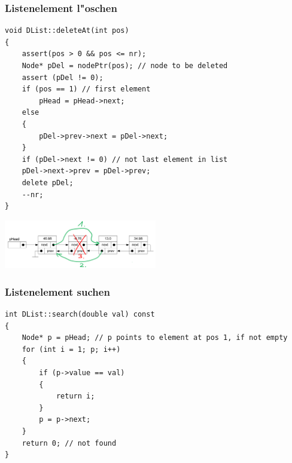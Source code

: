 \subsubsection{Listenelement l"oschen}
\begin{lstlisting}[style=C]
void DList::deleteAt(int pos)
{
	assert(pos > 0 && pos <= nr);
	Node* pDel = nodePtr(pos); // node to be deleted
	assert (pDel != 0);
	if (pos == 1) // first element
		pHead = pHead->next;
	else
	{
		pDel->prev->next = pDel->next;
	}
	if (pDel->next != 0) // not last element in list
	pDel->next->prev = pDel->prev;
	delete pDel;
	--nr;
}
\end{lstlisting}
\begin{flushleft}
{\includegraphics[width=0.5\textwidth]{images/Listen/DLL_Delete.png}}
\label{Fig: Element bei DLL l"oschen}
\end{flushleft}

\subsubsection{Listenelement suchen}
\begin{lstlisting}[style=C]
int DList::search(double val) const
{
	Node* p = pHead; // p points to element at pos 1, if not empty
	for (int i = 1; p; i++)
	{
		if (p->value == val)
		{
			return i;
		}
		p = p->next;
	}
	return 0; // not found
}
\end{lstlisting}
